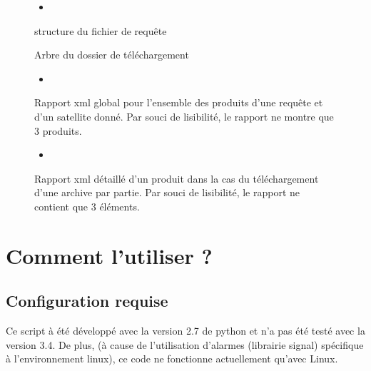 \documentclass[notitlepage]{report}
\newcommand{\insertcode}[2]{\begin{itemize}\item[]\end{itemize}} %
\begin{document}
\begin{figure}
\insertcode{"exemple/exempleRequete.csv"}{}
\caption{structure du fichier de requête}
\label{fig:req}
\end{figure}

\begin{figure}
\caption{Arbre du dossier de téléchargement}
\label{fig:treeDl}
\end{figure}

\begin{figure}
\insertcode{"exemple/exempleRapportS2.xml"}{}
\caption{Rapport xml global pour l'ensemble des produits d'une requête et d'un satellite donné. Par souci de lisibilité, le rapport ne montre que 3 produits.}
\label{fig:rapxmlglob}
\end{figure}

\begin{figure}
\insertcode{"exemple/exempleRapportS2det.xml"}{}
\caption{Rapport xml détaillé d'un produit dans la cas du téléchargement d'une archive par partie. Par souci de lisibilité, le rapport ne contient que 3 éléments.}
\label{fig:rapxmldet}
\end{figure}


\section{Comment l'utiliser ?}
\subsection{Configuration requise}
Ce script à été développé avec la version 2.7 de python et n'a pas été testé avec la version 3.4. De plus, (à cause de l'utilisation d'alarmes (librairie signal) spécifique à l'environnement linux), ce code ne fonctionne actuellement qu'avec Linux.
\end{document}
